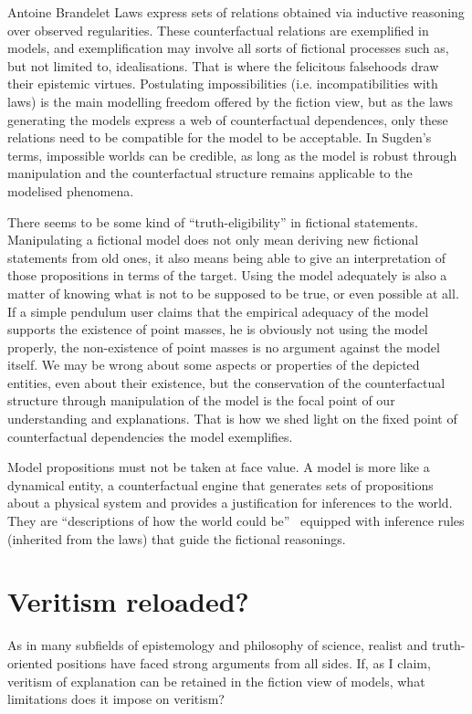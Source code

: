 \begin{artengenv}{Antoine Brandelet}
Laws express sets of relations obtained via inductive reasoning over observed regularities. These counterfactual relations are exemplified in models, and exemplification may involve all sorts of fictional processes such as, but not limited to, idealisations. That is where the felicitous falsehoods draw their epistemic virtues. Postulating impossibilities (i.e. incompatibilities with laws) is the main modelling freedom offered by the fiction view, but as the laws generating the models express a web of counterfactual dependences, only these relations need to be compatible for the model to be acceptable. In Sugden's terms, impossible worlds can be credible, as long as the model is robust through manipulation and the counterfactual structure remains applicable to the modelised phenomena.

There seems to be some kind of ``truth-eligibility'' in fictional statements. Manipulating a fictional model does not only mean deriving new fictional statements from old ones, it also means being able to give an interpretation of those propositions in terms of the target. Using the model adequately is also a matter of knowing what is not to be supposed to be true, or even possible at all. If a simple pendulum user claims that the empirical adequacy of the model supports the existence of point masses, he is obviously not using the model properly, the non-existence of point masses is no argument against the model itself. We may be wrong about some aspects or properties of the depicted entities, even about their existence, but the conservation of the counterfactual structure through manipulation of the model is the focal point of our understanding and explanations. That is how we shed light on the fixed point of counterfactual dependencies the model exemplifies.

Model propositions must not be taken at face value. A model is more like a dynamical entity, a counterfactual engine that generates sets of propositions about a physical system and provides a justification for inferences to the world. They are ``descriptions of how the world could be''~\parencite[p.241]{Sugden2013} equipped with inference rules (inherited from the laws) that guide the fictional reasonings. 


\section{Veritism reloaded?}\label{sec:veritism}


As in many subfields of epistemology and philosophy of science, realist and truth-oriented positions have faced strong arguments from all sides. If, as I claim, veritism of explanation can be retained in the fiction view of models, what limitations does it impose on veritism?


\end{artengenv}
